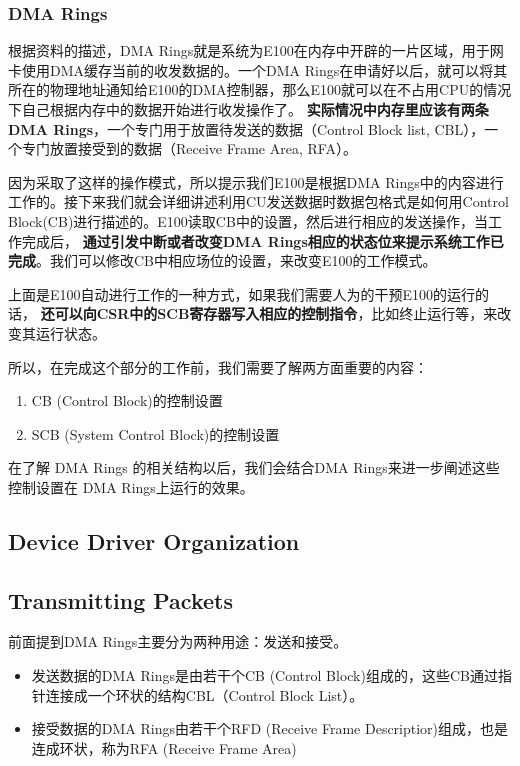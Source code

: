 \documentclass{article}
\newcommand{\highlight}[1]{{\bfseries \color{red}  #1}}
\begin{document}
\begin{CJK*}{UTF8}{gkai}
\subsubsection{DMA Rings}

根据资料的描述，DMA Rings就是系统为E100在内存中开辟的一片区域，用于网卡使用DMA缓存当前的收发数据的。一个DMA Rings在申请好以后，就可以将其所在的物理地址通知给E100的DMA控制器，那么E100就可以在不占用CPU的情况下自己根据内存中的数据开始进行收发操作了。\highlight{实际情况中内存里应该有两条DMA Rings}，一个专门用于放置待发送的数据（Control Block list, CBL），一个专门放置接受到的数据（Receive Frame Area, RFA）。

因为采取了这样的操作模式，所以提示我们E100是根据DMA Rings中的内容进行工作的。接下来我们就会详细讲述利用CU发送数据时数据包格式是如何用Control Block(CB)进行描述的。E100读取CB中的设置，然后进行相应的发送操作，当工作完成后，\highlight{通过引发中断或者改变DMA Rings相应的状态位来提示系统工作已完成}。我们可以修改CB中相应场位的设置，来改变E100的工作模式。

上面是E100自动进行工作的一种方式，如果我们需要人为的干预E100的运行的话，\highlight{还可以向CSR中的SCB寄存器写入相应的控制指令}，比如终止运行等，来改变其运行状态。

所以，在完成这个部分的工作前，我们需要了解两方面重要的内容：

\begin{enumerate}
\item{CB (Control Block)的控制设置}
\item{SCB (System Control Block)的控制设置}
\end{enumerate}

在了解 DMA Rings 的相关结构以后，我们会结合DMA Rings来进一步阐述这些控制设置在 DMA Rings上运行的效果。

\subsection{Device Driver Organization}


\subsection{Transmitting Packets}

前面提到DMA Rings主要分为两种用途：发送和接受。
\begin{itemize}

\item{发送数据的DMA Rings是由若干个CB (Control Block)组成的，这些CB通过指针连接成一个环状的结构CBL（Control Block List）。}
\item{接受数据的DMA Rings由若干个RFD (Receive Frame Descriptior)组成，也是连成环状，称为RFA (Receive Frame Area)}
\end{itemize}


\end{CJK*}
\end{document}
